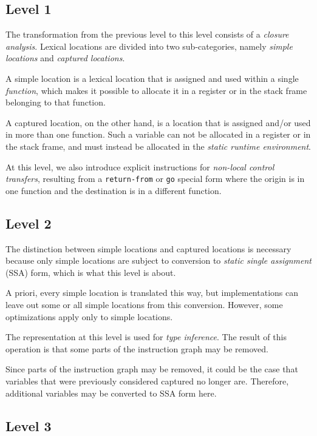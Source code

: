 \subsection{Level 1}

The transformation from the previous level to this level consists of a
\emph{closure analysis}.  Lexical locations are divided into two
sub-categories, namely \emph{simple locations} and \emph{captured
  locations}.  

A simple location is a lexical location that is assigned and used
within a single \emph{function}, which makes it possible to allocate
it in a register or in the stack frame belonging to that function.

A captured location, on the other hand, is a location that is assigned
and/or used in more than one function.  Such a variable can not be
allocated in a register or in the stack frame, and must instead be
allocated in the \emph{static runtime environment}. 

At this level, we also introduce explicit instructions for
\emph{non-local control transfers}, resulting from a
\texttt{return-from} or \texttt{go} special form where the origin is
in one function and the destination is in a different function.

\subsection{Level 2}

The distinction between simple locations and captured locations is
necessary because only simple locations are subject to conversion to
\emph{static single assignment} (SSA) form, which is what this level is
about.  

A priori, every simple location is translated this way, but
implementations can leave out some or all simple locations from this
conversion.  However, some optimizations apply only to simple
locations. 

The representation at this level is used for \emph{type inference}.
The result of this operation is that some parts of the instruction
graph may be removed.

Since parts of the instruction graph may be removed, it could be the
case that variables that were previously considered captured no longer
are.  Therefore, additional variables may be converted to SSA form
here. 

\subsection{Level 3}

